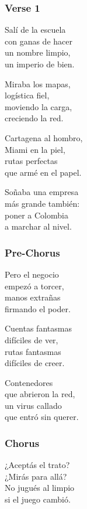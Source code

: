 \subsubsection{Verse 1}\label{verse-1-19}

Salí de la escuela\\
con ganas de hacer\\
un nombre limpio,\\
un imperio de bien.

Miraba los mapas,\\
logística fiel,\\
moviendo la carga,\\
creciendo la red.

Cartagena al hombro,\\
Miami en la piel,\\
rutas perfectas\\
que armé en el papel.

Soñaba una empresa\\
más grande también:\\
poner a Colombia\\
a marchar al nivel.

\subsubsection{Pre-Chorus}\label{pre-chorus-44}

Pero el negocio\\
empezó a torcer,\\
manos extrañas\\
firmando el poder.

Cuentas fantasmas\\
difíciles de ver,\\
rutas fantasmas\\
difíciles de creer.

Contenedores\\
que abrieron la red,\\
un virus callado\\
que entró sin querer.

\subsubsection{Chorus}\label{chorus-62}

¿Aceptás el trato?\\
¿Mirás para allá?\\
No jugués al limpio\\
si el juego cambió.

